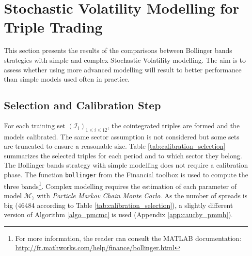 \documentclass[11pt,a4,twosided,singlespacing,titlepagenumber=on]{scrreprt}
\numberwithin{equation}{chapter} %
\theoremstyle{remark}
\begin{document}
\section{Stochastic Volatility Modelling for Triple Trading}
This section presents the results of the comparisons between Bollinger bands strategies with simple and complex Stochastic Volatility modelling. The aim is to assess whether using more advanced modelling will result to better performance than simple models used often in practice. 

\subsection{Selection and Calibration Step}
For each training set $(\mathcal{I}_i)_{1 \leq i \leq 12}$, the cointegrated triples are formed and the models calibrated. The same sector assumption is not considered but some sets are truncated to ensure a reasonable size. Table \ref{tab:calibration_selection} summarizes the selected triples for each period and to which sector they belong. The Bollinger bands strategy with simple modelling does not require a calibration phase. The function \texttt{bollinger} from the Financial toolbox is used to compute the three bands\footnote{For more information, the reader can consult the MATLAB documentation: \url{http://fr.mathworks.com/help/finance/bollinger.html}}. Complex modelling requires the estimation of each parameter of model $\mathcal{M}_7$ with \textit{Particle Markov Chain Monte Carlo}. As the number of spreads is big (46484 according to Table \ref{tab:calibration_selection}), a slightly different version of Algorithm \ref{algo_pmcmc} is used (Appendix \ref{app:cauchy_pmmh}).
\end{document}
